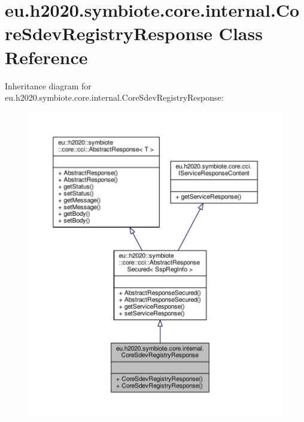 \hypertarget{classeu_1_1h2020_1_1symbiote_1_1core_1_1internal_1_1CoreSdevRegistryResponse}{}\section{eu.\+h2020.\+symbiote.\+core.\+internal.\+Core\+Sdev\+Registry\+Response Class Reference}
\label{classeu_1_1h2020_1_1symbiote_1_1core_1_1internal_1_1CoreSdevRegistryResponse}


Inheritance diagram for eu.\+h2020.\+symbiote.\+core.\+internal.\+Core\+Sdev\+Registry\+Response\+:\nopagebreak
\begin{figure}[H]
\begin{center}
\leavevmode
\includegraphics[width=350pt]{classeu_1_1h2020_1_1symbiote_1_1core_1_1internal_1_1CoreSdevRegistryResponse__inherit__graph}
\end{center}
\end{figure}


